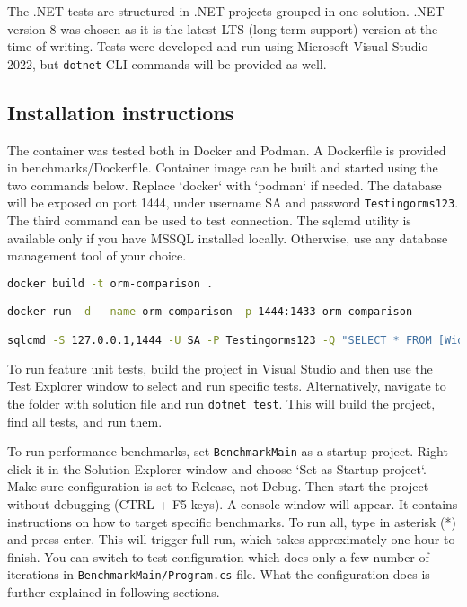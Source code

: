 The .NET tests are structured in .NET projects grouped in one solution. .NET version 8 was chosen as it is the latest LTS (long term support) version at the time of writing.\cite{netversions} Tests were developed and run using Microsoft Visual Studio 2022, but \texttt{dotnet} CLI commands will be provided as well.

\subsection{Installation instructions}
The container was tested both in Docker and Podman. A Dockerfile is provided in benchmarks/Dockerfile. Container image can be built and started using the two commands below. Replace `docker` with `podman` if needed. The database will be exposed on port 1444, under username SA and password \texttt{Testingorms123}.
The third command can be used to test connection. The sqlcmd utility is available only if you have MSSQL installed locally. Otherwise, use any database management tool of your choice.

\begin{lstlisting}[language=sh]
docker build -t orm-comparison .

docker run -d --name orm-comparison -p 1444:1433 orm-comparison

sqlcmd -S 127.0.0.1,1444 -U SA -P Testingorms123 -Q "SELECT * FROM [WideWorldImporters].[Purchasing].[PurchaseOrders]"
\end{lstlisting}

To run feature unit tests, build the project in Visual Studio and then use the Test Explorer window to select and run specific tests. Alternatively, navigate to the folder with solution file and run \lstinline{dotnet test}. This will build the project, find all tests, and run them. 

To run performance benchmarks, set \texttt{BenchmarkMain} as a startup project. Right-click it in the Solution Explorer window and choose `Set as Startup project`. Make sure configuration is set to Release, not Debug. Then start the project without debugging (CTRL + F5 keys). A console window will appear. It contains instructions on how to target specific benchmarks. To run all, type in asterisk (*) and press enter. This will trigger full run, which takes approximately one hour to finish. You can switch to test configuration which does only a few number of iterations in \texttt{BenchmarkMain/Program.cs} file. What the configuration does is further explained in following sections. 

